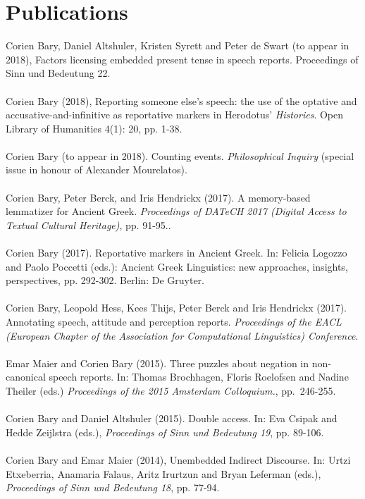 \documentclass[a4paper,11pt]{article}
\begin{document}
\section*{Publications}
Corien Bary, Daniel Altshuler, Kristen Syrett and Peter de Swart (to appear in 2018), Factors licensing embedded present tense in speech reports. Proceedings of Sinn und Bedeutung 22.\\\\
Corien Bary (2018), Reporting someone else's speech: the use of the optative and accusative-and-infinitive as reportative markers in Herodotus' \emph{Histories}. Open Library of Humanities 4(1): 20, pp. 1-38.\\\\
Corien Bary (to appear in 2018). Counting events. \emph{Philosophical Inquiry} (special issue in honour of Alexander Mourelatos).\\\\
Corien Bary, Peter Berck, and Iris Hendrickx (2017). A memory-based lemmatizer for Ancient Greek. \emph{Proceedings of DATeCH 2017 (Digital Access to Textual Cultural Heritage)}, pp. 91-95..\\\\
Corien Bary (2017). Reportative markers in Ancient Greek. In: Felicia Logozzo and Paolo Poccetti (eds.): Ancient Greek Linguistics: new approaches, insights, perspectives, pp. 292-302. Berlin: De Gruyter.\\\\
Corien Bary, Leopold Hess, Kees Thijs, Peter Berck and Iris Hendrickx (2017). Annotating speech, attitude and perception reports. \emph{Proceedings of the EACL  (European Chapter of the Association for Computational Linguistics) Conference}.\\\\
Emar Maier and Corien Bary (2015). Three puzzles about negation in non-canonical speech reports. In: Thomas Brochhagen, Floris Roelofsen and Nadine Theiler (eds.) \emph{Proceedings of the 2015 Amsterdam Colloquium.}, pp.\ 246-255.\\\\
Corien Bary and Daniel Altshuler (2015). Double access. In: Eva Csipak and Hedde Zeijlstra (eds.), \emph{Proceedings of Sinn und Bedeutung 19}, pp. 89-106.\\\\
Corien Bary and Emar Maier (2014), Unembedded Indirect Discourse. In: Urtzi Etxeberria, Anamaria Falaus, Aritz Irurtzun and Bryan Leferman (eds.), \emph{Proceedings of Sinn und Bedeutung 18}, pp. 77-94.\\\\
\end{document}
